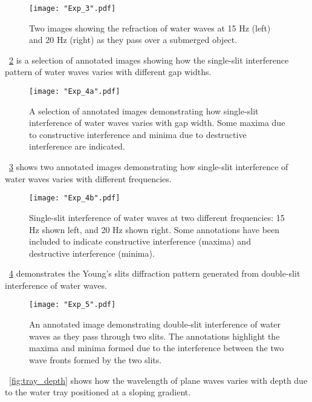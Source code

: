 \documentclass{article}
\newcommand{\figref}[2][\figurename~]{#1\ref{#2}}
\begin{document}
\begin{figure}[h]
\centering
\texttt{[image: "Exp\_3".pdf]}
\caption{Two images showing the refraction of water waves at 15 Hz (left) and 20 Hz (right) as they pass over a submerged object.}
\label{fig:refraction_image}
\end{figure}


\vspace{2mm}
\noindent
\figref{fig:single_interference1} is a selection of annotated images showing how the single-slit interference pattern of water waves varies with different gap widths.

\begin{figure}[h]
\centering
\texttt{[image: "Exp\_4a".pdf]}
\caption{A selection of annotated images demonstrating how single-slit interference of water waves varies with gap width. Some maxima due to constructive interference and minima due to destructive interference are indicated.}
\label{fig:single_interference1}
\end{figure}

\vspace{2mm}
\noindent
\figref{fig:single_interference2} shows two annotated images demonstrating how single-slit interference of water waves varies with different frequencies. 

\begin{figure}[h]
\centering
\texttt{[image: "Exp\_4b".pdf]}
\caption{Single-slit interference of water waves at two different frequencies: 15 Hz shown left, and 20 Hz shown right. Some annotations have been included to indicate constructive interference (maxima) and destructive interference (minima).}
\label{fig:single_interference2}
\end{figure}

\newpage
\vspace{2mm}
\noindent
\figref{fig:double_interference} demonstrates the Young's slits diffraction pattern generated from double-slit interference of water waves.

\begin{figure}[h]
\centering
\texttt{[image: "Exp\_5".pdf]}
\caption{An annotated image demonstrating double-slit interference of water waves as they pass through two slits. The annotations highlight the maxima and minima formed due to the interference between the two wave fronts formed by the two slits.}
\label{fig:double_interference}
\end{figure}


\vspace{2mm}
\noindent
\figref{fig:tray_depth} shows how the wavelength of plane waves varies with depth due to the water tray positioned at a sloping gradient.
\end{document}
